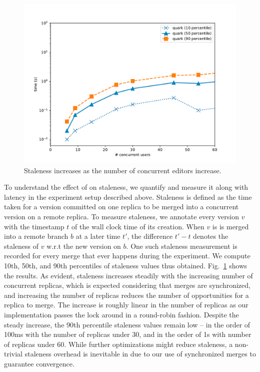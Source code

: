 \begin{figure}[ht]
  \centering
    \includegraphics[scale=0.4]{Figures/monkey_staleness}
\caption{Staleness increases as the number of concurrent editors
  increase.}
\label{fig:monkey-staleness}
\end{figure}

To understand the effect of \quark on
staleness, we quantify and measure it along with latency in the
experiment setup described above. Staleness is defined as the time
taken for a version committed on one replica to be merged into a
concurrent version on a remote replica. To measure staleness, we
annotate every version $v$ with the timestamp $t$ of the wall clock
time of its creation. When $v$ is is merged into a remote branch $b$
at a later time $t'$, the difference $t' - t$ denotes the staleness of
$v$ w.r.t the new version on $b$. One such staleness measurement is
recorded for every merge that ever happens during the experiment. We
compute 10th, 50th, and 90th percentiles of staleness values thus
obtained. Fig.~\ref{fig:monkey-staleness} shows the results. As
evident, staleness increases steadily with the increasing number of
concurrent replicas, which is expected considering that merges are
synchronized, and increasing the number of replicas reduces the number
of opportunities for a replica to merge. The increase is roughly
linear in the number of replicas as our implementation passes the lock
around in a round-robin fashion. Despite the steady increase, the 90th
percentile staleness values remain low -- in the order of 100ms with
the number of replicas under 30, and in the order of 1s with number of
replicas under 60. While further optimizations might reduce staleness,
a non-trivial staleness overhead is inevitable in \quark due to our
use of synchronized merges to guarantee convergence. 

